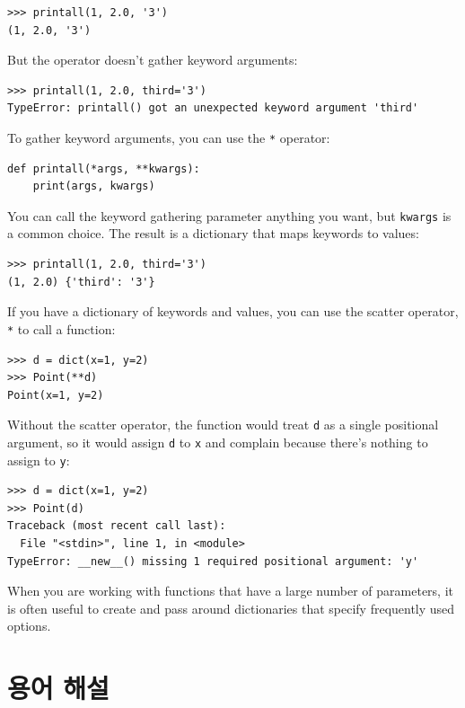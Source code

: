 \documentclass[10pt]{book}
\begin{document}
\begin{verbatim}
>>> printall(1, 2.0, '3')
(1, 2.0, '3')
\end{verbatim}
%
But the {\tt *} operator doesn't gather keyword arguments:

\begin{verbatim}
>>> printall(1, 2.0, third='3')
TypeError: printall() got an unexpected keyword argument 'third'
\end{verbatim}
%
To gather keyword arguments, you can use the {\tt **} operator:

\begin{verbatim}
def printall(*args, **kwargs):
    print(args, kwargs)
\end{verbatim}
%
You can call the keyword gathering parameter anything you want, but
{\tt kwargs} is a common choice.  The result is a dictionary that maps
keywords to values:

\begin{verbatim}
>>> printall(1, 2.0, third='3')
(1, 2.0) {'third': '3'}
\end{verbatim}
%
If you have a dictionary of keywords and values, you can use the
scatter operator, {\tt **} to call a function:

\begin{verbatim}
>>> d = dict(x=1, y=2)
>>> Point(**d)
Point(x=1, y=2)
\end{verbatim}
%
Without the scatter operator, the function would treat {\tt d} as
a single positional argument, so it would assign {\tt d} to
{\tt x} and complain because there's nothing to assign to {\tt y}:

\begin{verbatim}
>>> d = dict(x=1, y=2)
>>> Point(d)
Traceback (most recent call last):
  File "<stdin>", line 1, in <module>
TypeError: __new__() missing 1 required positional argument: 'y'
\end{verbatim}
%
When you are working with functions that have a large number of
parameters, it is often useful to create and pass around dictionaries
that specify frequently used options.


\section{용어 해설}
\end{document}
